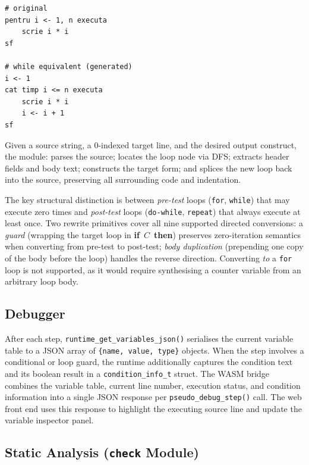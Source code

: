 \documentclass[conference]{IEEEtran}
\begin{document}
\begin{lstlisting}[language=pseudo, caption={Loop equivalence: a \texttt{pentru} (for) loop (top) converted to a \texttt{cat timp} (while) loop (bottom).}, label=lst:equiv]
# original
pentru i <- 1, n executa
    scrie i * i
sf

# while equivalent (generated)
i <- 1
cat timp i <= n executa
    scrie i * i
    i <- i + 1
sf
\end{lstlisting}

Given a source string, a 0-indexed target line, and the desired output
construct, the module: parses the source; locates the loop node via DFS;
extracts header fields and body text; constructs the target form; and splices
the new loop back into the source, preserving all surrounding code and
indentation.

The key structural distinction is between \emph{pre-test} loops
(\texttt{for}, \texttt{while}) that may execute zero times and
\emph{post-test} loops (\texttt{do-while}, \texttt{repeat}) that always
execute at least once.  Two rewrite primitives cover all nine supported
directed conversions: a \emph{guard} (wrapping the target loop in
\textbf{if}~$C$~\textbf{then}) preserves zero-iteration semantics when
converting from pre-test to post-test; \emph{body duplication} (prepending
one copy of the body before the loop) handles the reverse direction.
Converting \emph{to} a \texttt{for} loop is not supported, as it would
require synthesising a counter variable from an arbitrary loop body.

\subsection{Debugger}

After each step, \texttt{runtime\_get\_variables\_json()} serialises the
current variable table to a JSON array of \texttt{\{name, value, type\}}
objects.  When the step involves a conditional or loop guard, the runtime
additionally captures the condition text and its boolean result in a
\texttt{condition\_info\_t} struct.  The WASM bridge combines the variable
table, current line number, execution status, and condition information into a
single JSON response per \texttt{pseudo\_debug\_step()} call.  The web front
end uses this response to highlight the executing source line and update the
variable inspector panel.

\subsection{Static Analysis (\texttt{check} Module)}
\end{document}
